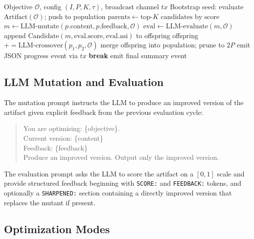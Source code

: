 \documentclass[11pt]{article}
\begin{document}
\begin{algorithm}[H]
\caption{OptimizeAnything Evolutionary Loop}
\label{alg:optimize}
\begin{algorithmic}[1]
\Require Objective $\mathcal{O}$, config $(I, P, K, \tau)$, broadcast channel $\mathit{tx}$
\State Bootstrap seed: evaluate $\text{Artifact}(\mathcal{O})$; push to population
  \State $\text{parents} \leftarrow \text{top-}K \text{ candidates by score}$
    \State $m \leftarrow \text{LLM-mutate}(p.\text{content}, p.\text{feedback}, \mathcal{O})$
    \State $\text{eval} \leftarrow \text{LLM-evaluate}(m, \mathcal{O})$
    \State append $\text{Candidate}(m, \text{eval.score}, \text{eval.asi})$ to offspring
  \EndFor
    \State offspring $\mathrel{+}= \text{LLM-crossover}(p_1, p_2, \mathcal{O})$
  \EndIf
  \State merge offspring into population; prune to $2P$
  \State emit JSON progress event via $\mathit{tx}$
    \State \textbf{break} 
  \EndIf
\EndFor
\State emit final summary event
\end{algorithmic}
\end{algorithm}

\subsection{LLM Mutation and Evaluation}

The mutation prompt instructs the LLM to produce an improved version of the
artifact given explicit feedback from the previous evaluation cycle:
\begin{quote}
\small\ttfamily
You are optimising: \{objective\}.\\
Current version: \{content\}\\
Feedback: \{feedback\}\\
Produce an improved version. Output only the improved version.
\end{quote}

The evaluation prompt asks the LLM to score the artifact on a $[0,1]$ scale
and provide structured feedback beginning with \texttt{SCORE:} and
\texttt{FEEDBACK:} tokens, and optionally a \texttt{SHARPENED:} section
containing a directly improved version that replaces the mutant if present.

\subsection{Optimization Modes}
\end{document}
